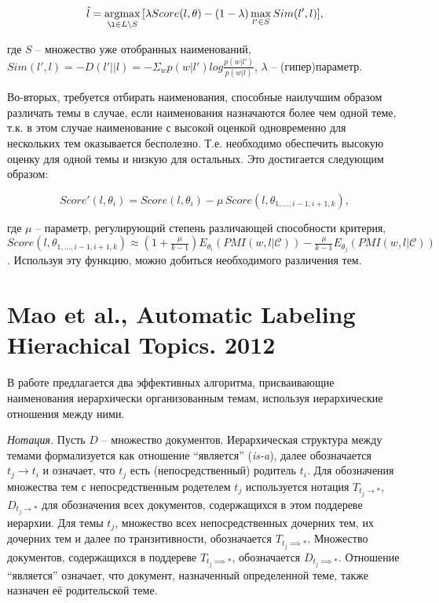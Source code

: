 \[\hat{l} = \argmax_{\l \in L\setminus S} \, [\lambda Score(l, \theta) - (1-\lambda)\max_{l' \in S} Sim(l', l)], \]

\noindent где $S$ -- множество уже отобранных наименований, $Sim(l', l) = -D(l'||l) = -\Sigma_w p(w|l') log \frac{p(w|l')}{p(w|l)}$, $\lambda$ -- (гипер)параметр.

Во-вторых, требуется отбирать наименования, способные наилучшим образом различать темы в случае, если наименования назначаются более чем одной теме, т.к. в этом случае наименование с высокой оценкой одновременно для нескольких тем оказывается бесполезно. Т.е. необходимо обеспечить высокую оценку для одной темы и низкую для остальных. Это достигается следующим образом:

\[Score'(l, \theta_i) = Score(l, \theta_i) - \mu\,Score(l, \theta_{1,\ldots, i-1,i+1, k}),\]

\noindent где $\mu$ -- параметр, регулирующий степень различающей способности критерия, $Score(l, \theta_{1,\ldots, i-1,i+1, k}) \approx (1 + \frac{\mu}{k-1})E_{\theta_i}(PMI(w,l|\mathcal{C})) - \frac{\mu}{k-1}E_{\theta_j}(PMI(w,l|\mathcal{C}))$. Используя эту функцию, можно добиться необходимого различения тем.


\section{Mao et al., Automatic Labeling Hierachical Topics. 2012}


В работе предлагается два эффективных алгоритма, присваивающие наименования иерархически организованным темам, используя иерархические отношения между ними. 

\textit{Нотация.} Пусть $D$ -- множество документов. Иерархическая структура между темами формализуется как отношение ``является'' (\textit{is-a}), далее обозначается $t_j \to t_i$ и означает, что $t_j$ есть (непосредственный) родитель $t_i$. Для обозначения множества тем с непосредственным родетелем $t_j$ используется нотация $T_{t_j \to *}$, $D_{t_j \to *}$ для обозначения всех документов, содержащихся в этом поддереве иерархии. Для темы $t_j$, множество всех непосредственных дочерних тем, их дочерних тем и далее по транзитивности, обозначается $T_{t_j \implies *}$. Множество документов, содержащихся в поддереве $T_{t_j \implies *}$, обозначается $D_{t_j \implies *}$. Отношение ``является'' означает, что документ, назначенный определенной теме, также назначен её родительской теме. 

